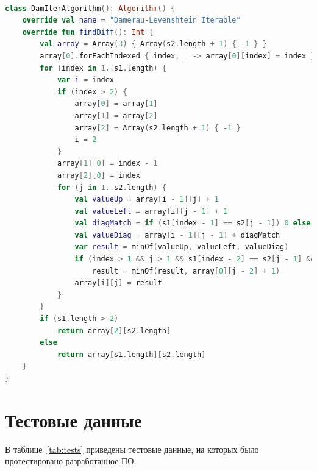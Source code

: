 \documentclass[12pt]{report}
\begin{document}
    \begin{lstlisting}[label=code:levDamCasual,caption=Метод для нахождения расстояния Дамерау-Левенштейна
    итерационно,language=kotlin]

class DamIterAlgorithm(): Algorithm() {
    override val name = "Damerau-Levenshtein Iterable"
    override fun findDiff(): Int {
        val array = Array(3) { Array(s2.length + 1) { -1 } }
        array[0].forEachIndexed { index, _ -> array[0][index] = index }
        for (index in 1..s1.length) {
            var i = index
            if (index > 2) {
                array[0] = array[1]
                array[1] = array[2]
                array[2] = Array(s2.length + 1) { -1 }
                i = 2
            }
            array[1][0] = index - 1
            array[2][0] = index
            for (j in 1..s2.length) {
                val valueUp = array[i - 1][j] + 1
                val valueLeft = array[i][j - 1] + 1
                val diagMatch = if (s1[index - 1] == s2[j - 1]) 0 else 1
                val valueDiag = array[i - 1][j - 1] + diagMatch
                var result = minOf(valueUp, valueLeft, valueDiag)
                if (index > 1 && j > 1 && s1[index - 2] == s2[j - 1] && s1[index - 1] == s2[j - 2])
                    result = minOf(result, array[0][j - 2] + 1)
                array[i][j] = result
            }
        }
        if (s1.length > 2)
            return array[2][s2.length]
        else
            return array[s1.length][s2.length]
    }
}
    \end{lstlisting}


    \section{Тестовые данные}
    В таблице~\ref{tab:tests} приведены тестовые данные, на которых было протестировано разработанное ПО.
\end{document}
